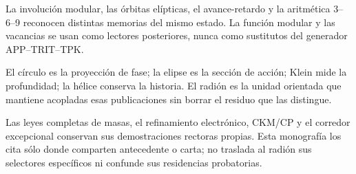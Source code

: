 \begin{narrativebox}[title={Caracteres modular, orbital y aritmético de frontera}]
La involución modular, las órbitas elípticas, el avance-retardo y la aritmética
3--6--9 reconocen distintas memorias del mismo estado. La función modular y
las vacancias se usan como lectores posteriores, nunca como sustitutos del
generador APP--TRIT--TPK.
\end{narrativebox}

\begin{thesisbox}[title={Síntesis operatoria de fase, acción, profundidad y memoria}]
El círculo es la proyección de fase; la elipse es la sección de acción; Klein
mide la profundidad; la hélice conserva la historia. El radión es la unidad
orientada que mantiene acopladas esas publicaciones sin borrar el residuo que
las distingue.
\end{thesisbox}

\begin{statusbox}[title={Delimitación de dominios y continuidad causal}]
Las leyes completas de masas, el refinamiento electrónico, CKM/CP y el
corredor excepcional conservan sus demostraciones rectoras propias. Esta monografía los
cita sólo donde comparten antecedente o carta; no traslada al radión sus
selectores específicos ni confunde sus residencias probatorias.
\end{statusbox}
